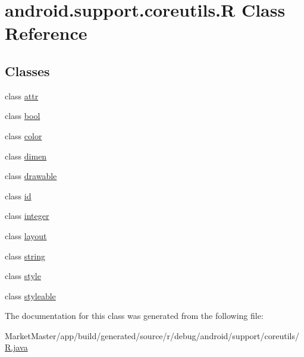 \hypertarget{classandroid_1_1support_1_1coreutils_1_1R}{}\section{android.\+support.\+coreutils.\+R Class Reference}
\label{classandroid_1_1support_1_1coreutils_1_1R}
\subsection*{Classes}
\begin{DoxyCompactItemize}
\item 
class \mbox{\hyperlink{classandroid_1_1support_1_1coreutils_1_1R_1_1attr}{attr}}
\item 
class \mbox{\hyperlink{classandroid_1_1support_1_1coreutils_1_1R_1_1bool}{bool}}
\item 
class \mbox{\hyperlink{classandroid_1_1support_1_1coreutils_1_1R_1_1color}{color}}
\item 
class \mbox{\hyperlink{classandroid_1_1support_1_1coreutils_1_1R_1_1dimen}{dimen}}
\item 
class \mbox{\hyperlink{classandroid_1_1support_1_1coreutils_1_1R_1_1drawable}{drawable}}
\item 
class \mbox{\hyperlink{classandroid_1_1support_1_1coreutils_1_1R_1_1id}{id}}
\item 
class \mbox{\hyperlink{classandroid_1_1support_1_1coreutils_1_1R_1_1integer}{integer}}
\item 
class \mbox{\hyperlink{classandroid_1_1support_1_1coreutils_1_1R_1_1layout}{layout}}
\item 
class \mbox{\hyperlink{classandroid_1_1support_1_1coreutils_1_1R_1_1string}{string}}
\item 
class \mbox{\hyperlink{classandroid_1_1support_1_1coreutils_1_1R_1_1style}{style}}
\item 
class \mbox{\hyperlink{classandroid_1_1support_1_1coreutils_1_1R_1_1styleable}{styleable}}
\end{DoxyCompactItemize}


The documentation for this class was generated from the following file\+:\begin{DoxyCompactItemize}
\item 
Market\+Master/app/build/generated/source/r/debug/android/support/coreutils/\mbox{\hyperlink{debug_2android_2support_2coreutils_2R_8java}{R.\+java}}\end{DoxyCompactItemize}
